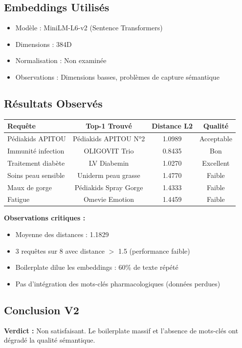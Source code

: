 \documentclass[12pt,a4paper]{article}
\begin{document}
\subsection{Embeddings Utilisés}
\begin{itemize}
    \item Modèle : MiniLM-L6-v2 (Sentence Transformers)
    \item Dimensions : 384D
    \item Normalisation : Non examinée
    \item Observations : Dimensions basses, problèmes de capture sémantique
\end{itemize}

\subsection{Résultats Observés}
\begin{center}
\begin{tabular}{|l|c|c|c|}
\hline
\textbf{Requête} & \textbf{Top-1 Trouvé} & \textbf{Distance L2} & \textbf{Qualité} \\
\hline
Pédiakids APITOU & Pédiakids APITOU N°2 & 1.0989 & Acceptable \\
Immunité infection & OLIGOVIT Trio & 0.8435 & Bon \\
Traitement diabète & LV Diabemin & 1.0270 & Excellent \\
Soins peau sensible & Uniderm peau grasse & 1.4770 & Faible \\
Maux de gorge & Pédiakids Spray Gorge & 1.4333 & Faible \\
Fatigue & Omevie Emotion & 1.4459 & Faible \\
\hline
\end{tabular}
\end{center}

\textbf{Observations critiques :}
\begin{itemize}
    \item Moyenne des distances : 1.1829
    \item 3 requêtes sur 8 avec distance $>$ 1.5 (performance faible)
    \item Boilerplate dilue les embeddings : 60\% de texte répété
    \item Pas d'intégration des mots-clés pharmacologiques (données perdues)
\end{itemize}

\subsection{Conclusion V2}
\textbf{Verdict :} Non satisfaisant. Le boilerplate massif et l'absence de mots-clés ont dégradé la qualité sémantique.
\end{document}
